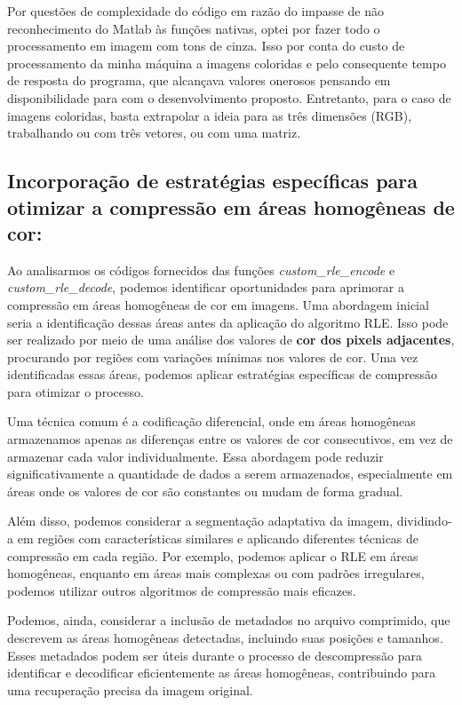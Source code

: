 \documentclass{article}
\begin{document}
Por questões de complexidade do código em razão do impasse de não reconhecimento do Matlab às funções nativas, optei por fazer todo o processamento em imagem com tons de cinza. Isso por conta do custo de processamento da minha máquina a imagens coloridas e pelo consequente tempo de resposta do programa, que alcançava valores onerosos pensando em disponibilidade para com o desenvolvimento proposto.
Entretanto, para o caso de imagens coloridas, basta extrapolar a ideia para as três dimensões (RGB), trabalhando ou com três vetores, ou com uma matriz.

\subsection{Incorporação de estratégias específicas para otimizar a compressão em áreas homogêneas de cor:}

Ao analisarmos os códigos fornecidos das funções \textit{custom\_rle\_encode} e \textit{custom\_rle\_decode}, podemos identificar oportunidades para aprimorar a compressão em áreas homogêneas de cor em imagens. Uma abordagem inicial seria a identificação dessas áreas antes da aplicação do algoritmo RLE. Isso pode ser realizado por meio de uma análise dos valores de \textbf{cor dos pixels adjacentes}, procurando por regiões com variações mínimas nos valores de cor. Uma vez identificadas essas áreas, podemos aplicar estratégias específicas de compressão para otimizar o processo.

Uma técnica comum é a codificação diferencial, onde em áreas homogêneas armazenamos apenas as diferenças entre os valores de cor consecutivos, em vez de armazenar cada valor individualmente. Essa abordagem pode reduzir significativamente a quantidade de dados a serem armazenados, especialmente em áreas onde os valores de cor são constantes ou mudam de forma gradual.

Além disso, podemos considerar a segmentação adaptativa da imagem, dividindo-a em regiões com características similares e aplicando diferentes técnicas de compressão em cada região. Por exemplo, podemos aplicar o RLE em áreas homogêneas, enquanto em áreas mais complexas ou com padrões irregulares, podemos utilizar outros algoritmos de compressão mais eficazes.

Podemos, ainda, considerar a inclusão de metadados no arquivo comprimido, que descrevem as áreas homogêneas detectadas, incluindo suas posições e tamanhos. Esses metadados podem ser úteis durante o processo de descompressão para identificar e decodificar eficientemente as áreas homogêneas, contribuindo para uma recuperação precisa da imagem original.
\end{document}
